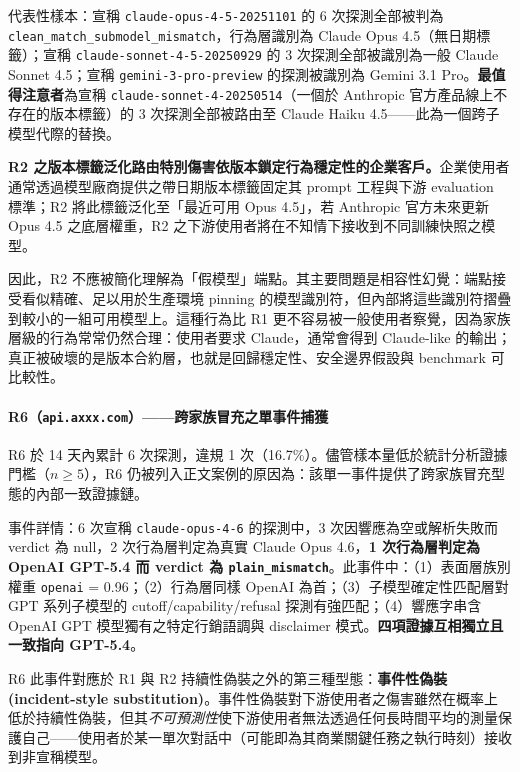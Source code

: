 \documentclass[UTF8,fontset=none,10pt,a4paper,twocolumn]{ctexart}
\begin{document}
代表性樣本：宣稱 \texttt{claude-opus-4-5-20251101} 的 6 次探測全部被判為 \texttt{clean\_match\_submodel\_mismatch}，行為層識別為 Claude Opus 4.5（無日期標籤）；宣稱 \texttt{claude-sonnet-4-5-20250929} 的 3 次探測全部被識別為一般 Claude Sonnet 4.5；宣稱 \texttt{gemini-3-pro-preview} 的探測被識別為 Gemini 3.1 Pro。\textbf{最值得注意者}為宣稱 \texttt{claude-sonnet-4-20250514}（一個於 Anthropic 官方產品線上不存在的版本標籤）的 3 次探測全部被路由至 Claude Haiku 4.5——此為一個跨子模型代際的替換。

\textbf{R2 之版本標籤泛化路由特別傷害依版本鎖定行為穩定性的企業客戶。}企業使用者通常透過模型廠商提供之帶日期版本標籤固定其 prompt 工程與下游 evaluation 標準；R2 將此標籤泛化至「最近可用 Opus 4.5」，若 Anthropic 官方未來更新 Opus 4.5 之底層權重，R2 之下游使用者將在不知情下接收到不同訓練快照之模型。

因此，R2 不應被簡化理解為「假模型」端點。其主要問題是相容性幻覺：端點接受看似精確、足以用於生產環境 pinning 的模型識別符，但內部將這些識別符摺疊到較小的一組可用模型上。這種行為比 R1 更不容易被一般使用者察覺，因為家族層級的行為常常仍然合理：使用者要求 Claude，通常會得到 Claude-like 的輸出；真正被破壞的是版本合約層，也就是回歸穩定性、安全邊界假設與 benchmark 可比較性。

\paragraph{R6（\texttt{api.axxx.com}）——跨家族冒充之單事件捕獲}
R6 於 14 天內累計 6 次探測，違規 1 次（16.7\%）。儘管樣本量低於統計分析證據門檻（$n{\geq}5$），R6 仍被列入正文案例的原因為：該單一事件提供了跨家族冒充型態的內部一致證據鏈。

事件詳情：6 次宣稱 \texttt{claude-opus-4-6} 的探測中，3 次因響應為空或解析失敗而 verdict 為 null，2 次行為層判定為真實 Claude Opus 4.6，\textbf{1 次行為層判定為 OpenAI GPT-5.4 而 verdict 為 \texttt{plain\_mismatch}}。此事件中：（1）表面層族別權重 \texttt{openai} = 0.96；（2）行為層同樣 OpenAI 為首；（3）子模型確定性匹配層對 GPT 系列子模型的 cutoff/capability/refusal 探測有強匹配；（4）響應字串含 OpenAI GPT 模型獨有之特定行銷語調與 disclaimer 模式。\textbf{四項證據互相獨立且一致指向 GPT-5.4}。

R6 此事件對應於 R1 與 R2 持續性偽裝之外的第三種型態：\textbf{事件性偽裝 (incident-style substitution)}。事件性偽裝對下游使用者之傷害雖然在概率上低於持續性偽裝，但其\emph{不可預測性}使下游使用者無法透過任何長時間平均的測量保護自己——使用者於某一單次對話中（可能即為其商業關鍵任務之執行時刻）接收到非宣稱模型。
\end{document}
